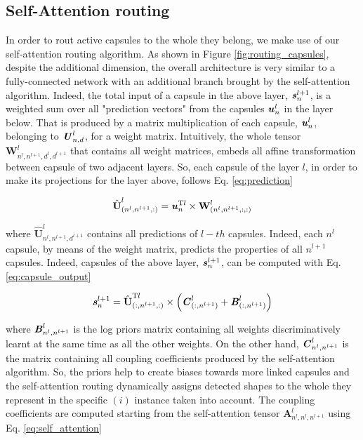 \documentclass{article}
\begin{document}
\subsection*{Self-Attention routing}
In order to rout active capsules to the whole they belong, we make use of our self-attention routing algorithm. As shown in Figure \ref{fig:routing_capsules}, despite the additional dimension, the overall architecture is very similar to a fully-connected network with an additional branch brought by the self-attention algorithm. Indeed, the total input of a capsule  in the above layer, $\textbf{\textit{s}}^{l+1}_{n}$, is a weighted sum over all "prediction vectors" from the capsules $\textbf{\textit{u}}^{l}_{n}$ in the layer below. That is produced by a matrix multiplication of each capsule, $\textbf{\textit{u}}^{l}_{n}$, belonging to $\textbf{\textit{U}}^{l}_{n,d}$, for a weight matrix. Intuitively, the whole tensor $\textbf{W}^{l}_{n^{l},n^{l+1},d^{l},d^{l+1}}$ that contains all weight matrices, embeds all affine transformation between capsule of two adjacent layers. So, each capsule of the layer $l$, in order to make its projections for the layer above, follows Eq. \ref{eq:prediction}
\begin{ceqn}
\begin{gather}
    \hat{\textbf{U}}_{(n^l,n^{l+1},:)}^{l}=\textbf{\textit{u}}_{n}^{\textrm{T}l}\times\textbf{W}_{(n^l,n^{l+1},:,:)}^{l}
    \label{eq:prediction}
\end{gather}
\end{ceqn}
 where $\hat{\textbf{U}}_{n^l,n^{l+1},d^{l+1}}^{l}$ contains all predictions of $l-th$ capsules. Indeed, each $n^l$ capsule, by means of the weight matrix, predicts the properties of all $n^{l+1}$ capsules. Indeed, capsules of the above layer, $\textbf{\textit{s}}^{l+1}_{n}$, can be computed with Eq. \ref{eq:capsule_output}
\begin{ceqn}
\begin{gather}
    \textbf{\textit{s}}^{l+1}_{n} = \hat{\textbf{U}}_{(:,n^{l+1},:)}^{\textrm{T}l} \times \left(\textbf{\textit{C}}^{l}_{(:,n^{l+1})} + \textbf{\textit{B}}^l_{(:,n^{l+1})}\right)
    \label{eq:capsule_output}
\end{gather}
\end{ceqn}
where $\textbf{\textit{B}}^l_{n^l,n^{l+1}}$ is the log priors matrix containing all weights discriminatively learnt at the same time as all the other weights. On the other hand, $\textbf{\textit{C}}^{l}_{n^l,n^{l+1}}$ is the matrix containing all coupling coefficients produced by the self-attention algorithm. So, the priors help to create biases towards more linked capsules and the self-attention routing dynamically assigns detected shapes to the whole they represent in the specific $(i)$ instance taken into account. The coupling coefficients are computed starting from the self-attention tensor $\textbf{A}^l_{n^l,n^l,n^{l+1}}$ using Eq. \ref{eq:self_attention}
\end{document}
